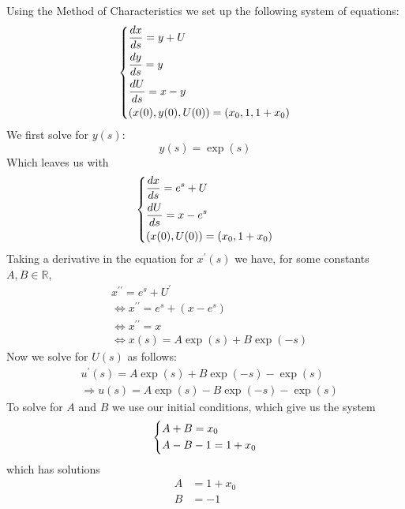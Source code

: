 \documentclass{article}
\begin{document}
Using the Method of Characteristics we set up the following system of
equations:
%
\begin{equation*}
    \begin{dcases}
        \frac{d x}{d s} = y + U \\
        \frac{d y}{d s} = y \\
        \frac{d U}{d s} = x - y \\
        \left( x(0), y(0), U(0)\right) = \left( x_0, 1, 1 + x_0 \right)
    \end{dcases}
\end{equation*}
%
We first solve for $y(s)$:
%
\begin{equation*}
    y(s) = \exp(s)
\end{equation*}
%
Which leaves us with
%
\begin{equation*}
    \begin{dcases}
        \frac{d x}{d s} = e^s + U \\
        \frac{d U}{d s} = x - e^s \\
        \left( x(0), U(0)\right) = \left( x_0, 1 + x_0 \right)
    \end{dcases}
\end{equation*}
%
Taking a derivative in the equation for $x^{\prime}(s)$ we have, for
some constants $A, B \in \mathbb{R}$,
%
\begin{align*}
    &x^{\prime \prime} = e^s + U^{\prime} \\
    &\iff x^{\prime \prime} = e^s + \left(x - e^s\right) \\
    &\iff x^{\prime \prime} = x \\
    &\iff x(s) = A \exp(s) + B \exp(-s)
\end{align*}
%
Now we solve for $U(s)$ as follows:
%
\begin{align*}
    &u^{\prime}(s) = A \exp(s) + B \exp(-s) - \exp(s) \\
    &\Rightarrow u(s) = A \exp(s) - B \exp(-s) - \exp(s)
\end{align*}
%
To solve for $A$ and $B$ we use our initial conditions, which give us
the system
%
\begin{equation*}
    \begin{dcases}
        A + B = x_0 \\
        A - B - 1 = 1 + x_0
    \end{dcases}
\end{equation*}
%
which has solutions
%
\begin{align*}
    A &= 1 + x_0 \\
    B &= -1
\end{align*}
\end{document}
